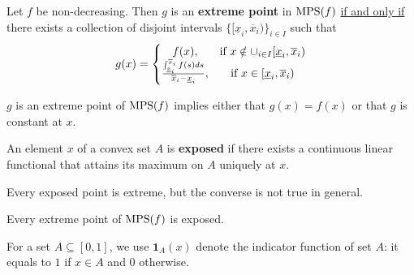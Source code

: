 \documentclass[11pt]{elegantbook}
\begin{document}
\begin{theorem}
    Let $f$ be non-decreasing. Then $g$ is an \textbf{extreme point} in $\textnormal{MPS}(f)$ \underline{if and only if} there exists a collection of disjoint intervals $\{[\underline{x}_i,\overline{x}_i)\}_{i\in I}$ such that
    \begin{equation}
        \begin{aligned}
            g(x)=\left\{\begin{matrix}
                f(x),&\textnormal{if } x\notin \cup_{i\in I}[\underline{x}_i,\overline{x}_i)\\
                \frac{\int_{\underline{x}_i}^{\overline{x}_i}f(s)ds}{\overline{x}_i-\underline{x}_i},&\textnormal{if } x\in [\underline{x}_i,\overline{x}_i)
            \end{matrix}\right.
        \end{aligned}
        \nonumber
    \end{equation}
\end{theorem}
$g$ is an extreme point of $\textnormal{MPS}(f)$ implies either that $g(x)=f(x)$ or that $g$ is constant at $x$.

\begin{definition}
    \normalfont
    An element $x$ of a convex set $A$ is \textbf{exposed} if there exists a continuous linear functional that attains its maximum on $A$ uniquely at $x$.
\end{definition}
\begin{note}
    Every exposed point is extreme, but the converse is not true in general.
\end{note}

\begin{corollary}
    Every extreme point of $\textnormal{MPS}(f)$ is exposed.
\end{corollary}

For a set $A\subseteq [0,1]$, we use $\mathbf{1}_{A}(x)$ denote the indicator function of set $A$: it equals to $1$ if $x\in A$ and $0$ otherwise.
\end{document}
